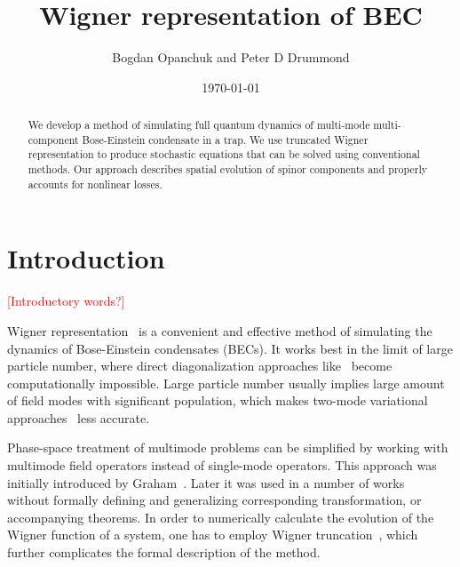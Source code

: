 \documentclass[12pt]{iopart}
\newcommand{\todo}[1]{\textcolor{red}{[#1]}}
\newcommand{\swinaffiliation}{Centre for Atom Optics and Ultrafast Spectroscopy, Swinburne University of Technology, Hawthorn, VIC 3122, Australia}
\begin{document}
\title{Wigner representation of BEC}

\author{Bogdan Opanchuk and Peter D Drummond}
\address{\swinaffiliation}

\date{\today}
\begin{abstract}
We develop a method of simulating full quantum dynamics of multi-mode multi-component Bose-Einstein condensate in a trap.
We use truncated Wigner representation to produce stochastic equations that can be solved using conventional methods.
Our approach describes spatial evolution of spinor components and properly accounts for nonlinear losses.
\end{abstract}





\section{Introduction}

\todo{Introductory words?}

Wigner representation~\cite{Gardiner2004} is a convenient and effective method of simulating the dynamics of Bose-Einstein condensates (BECs).
It works best in the limit of large particle number, where direct diagonalization approaches like~\cite{Sakmann2009} become computationally impossible.
Large particle number usually implies large amount of field modes with significant population, which makes two-mode variational approaches~\cite{Li2008,Li2009,Sinatra2011} less accurate.

Phase-space treatment of multimode problems can be simplified by working with multimode field operators instead of single-mode operators.
This approach was initially introduced by Graham~\cite{Graham1970,Graham1970a}.
Later it was used in a number of works~\cite{Steel1998,Isella2006,Norrie2006a} without formally defining and generalizing corresponding transformation, or accompanying theorems.
In order to numerically calculate the evolution of the Wigner function of a system, one has to employ Wigner truncation~\cite{Drummond1993,Steel1998,Sinatra2002}, which further complicates the formal description of the method.
\end{document}
